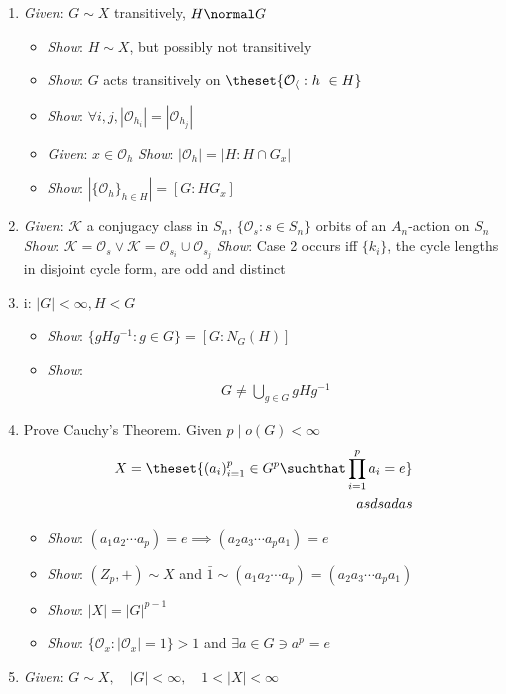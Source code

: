 \begin{enumerate}
\def\labelenumi{\arabic{enumi}.}
\item
  \emph{Given}: \(G \sim X\) transitively, \(H \normal G\)

  \begin{itemize}
  \tightlist
  \item
    \emph{Show}: \(H \sim X\), but possibly not transitively
  \item
    \emph{Show}: \(G\) acts transitively on
    \(\theset{ \mathcal{O_h} : h\ \in H}\)
  \item
    \emph{Show}:
    \(\forall i, j, |\mathcal{O}_{h_i}| = |\mathcal{O}_{h_j}|\)
  \item
    \emph{Given}: \(x\in \mathcal{O}_h\) \emph{Show}:
    \(|\mathcal{O}_h| = |H : H \cap G_x|\)
  \item
    \emph{Show}: \(|\{\mathcal{O}_h\}_{h\in H}| = [G : HG_x]\)
  \end{itemize}
\item
  \emph{Given}: \(\mathcal{K}\) a conjugacy class in \(S_n\),
  \(\{\mathcal{O}_{s}:s\in S_n\}\) orbits of an \(A_n\)-action on
  \(S_n\) \emph{Show}:
  \(\mathcal{K} = \mathcal{O}_s \vee \mathcal{K} = \mathcal{O}_{s_i} \cup \mathcal{O}_{s_j}\)
  \emph{Show}: Case 2 occurs iff \(\{k_i\}\), the cycle lengths in
  disjoint cycle form, are odd and distinct
\item
  i: \(|G| < \infty, H < G\)

  \begin{itemize}
  \tightlist
  \item
    \emph{Show}: \(\{ gHg^{-1} : g\in G\} = [G : N_G(H)]\)
  \item
    \emph{Show}:
    \begin{align*}G \neq \bigcup_{g\in G} gHg^{-1}\end{align*}
  \end{itemize}
\item
  Prove Cauchy's Theorem. Given \(p\mid o(G) <\infty\) \begin{align*}
  X = \theset{ (a_{i})_{i=1}^p \in G^p \suchthat \prod_{i=1}^p a_i = e} \\
  asdsadas
  \end{align*}

  \begin{itemize}
  \tightlist
  \item
    \emph{Show}:
    \((a_1 a_2\cdots a_p) = e \implies (a_2 a_3 \cdots a_p a_1) = e\)
  \item
    \emph{Show}: \((Z_p, +) \sim X\) and
    \(\bar 1 \sim (a_1 a_2 \cdots a_p) = (a_2 a_3 \cdots a_p a_1)\)
  \item
    \emph{Show}: \(|X| = |G|^{p-1}\)
  \item
    \emph{Show}: \(\{ \mathcal{O}_x : |\mathcal{O}_x| = 1 \} > 1\) and
    \(\exists a \in G \ni a^p = e\)
  \end{itemize}
\item
  \emph{Given}:
  \(G \sim X, \quad |G| < \infty , \quad 1 < |X| < \infty\)
\end{enumerate}

